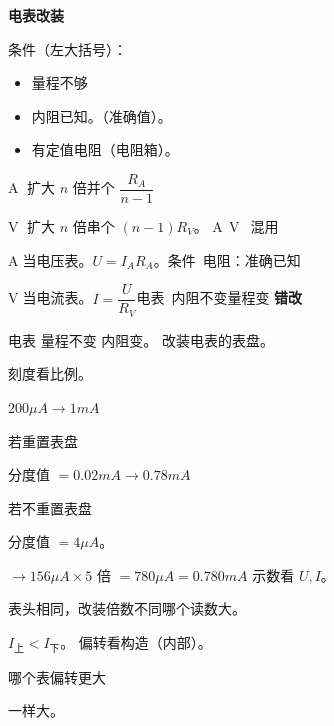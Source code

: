\textbf{电表改装} %

条件（左大括号）：
\begin{itemize}
\item 量程不够
\item 内阻已知。（准确值）。
\item 有定值电阻（电阻箱）。
\end{itemize}

\textcircled{A} 扩大 $n$ 倍\quad 并个 $\dfrac{R_A}{n-1}$

\textcircled{V} 扩大 $n$ 倍\quad 串个 $(n-1)R_V$。
\textcircled{A}\,\textcircled{V}\ 混用 %


\textcircled{A}当电压表。$U=I_AR_A$。\quad 条件\ 电阻：准确已知


\textcircled{V}当电流表。$I=\dfrac{U}{R_V}$\quad 电表\ 内阻不变量程变
\textbf{错改} %



电表 量程不变 内阻变。
改装电表的表盘。

刻度看比例。


$200\unit{\mu A}\to 1\unit{mA}$

若重置表盘

分度值 $=0.02\unit{mA}\to 0.78\unit{mA}$

若不重置表盘

分度值 $=4\unit{\mu A}$。

$\to 156\unit{\mu A}\times 5$ 倍 $=780\unit{\mu A}=0.780\unit{mA}$
示数看 $U,I$。


表头相同，改装倍数不同\quad 哪个读数大。

$I_{\text{上}}<I_{\text{下}}$。
偏转看构造（内部）。

哪个表偏转更大


一样大。
